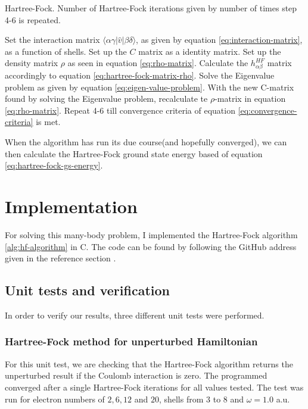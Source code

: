 \documentclass[11pt]{article}
\newcommand{\CC}{C\nolinebreak\hspace{-.05em}\raisebox{.4ex}{\tiny\bf +}\nolinebreak\hspace{-.10em}\raisebox{.4ex}{\tiny\bf +}}
\def\CC{{C\nolinebreak[4]\hspace{-.05em}\raisebox{.4ex}{\tiny\bf ++}}}
\begin{document}
\begin{algorithm}[H]
\caption{Hartree-Fock. Number of Hartree-Fock iterations given by number of times step 4-6 is repeated.}
\label{alg:hf-algorithm}
\begin{algorithmic}[1]
\State Set the interaction matrix $\langle \alpha \gamma |\hat{v}| \beta \delta \rangle$, as given by equation \eqref{eq:interaction-matrix}, as a function of shells.
\State Set up the $C$ matrix as a identity matrix.
\State Set up the density matrix $\rho$ as seen in equation \eqref{eq:rho-matrix}.
\State Calculate the $h^{HF}_{\alpha\beta}$ matrix accordingly to equation \eqref{eq:hartree-fock-matrix-rho}.
\State Solve the Eigenvalue problem as given by equation \eqref{eq:eigen-value-problem}.
\State With the new C-matrix found by solving the Eigenvalue problem, recalculate te $\rho$-matrix in equation \eqref{eq:rho-matrix}.
\State Repeat 4-6 till convergence criteria of equation \eqref{eq:convergence-criteria} is met.
\end{algorithmic}
\end{algorithm}

When the algorithm has run its due course(and hopefully converged), we can then calculate the Hartree-Fock ground state energy based of equation \eqref{eq:hartree-fock-gs-energy}.

\section{Implementation}
For solving this many-body problem, I implemented the Hartree-Fock algorithm \ref{alg:hf-algorithm} in \CC. The code can be found by following the GitHub address given in the reference section \cite{github}.

\subsection{Unit tests and verification}
In order to verify our results, three different unit tests were performed.

\subsubsection{Hartree-Fock method for unperturbed Hamiltonian}
For this unit test, we are checking that the Hartree-Fock algorithm returns the unperturbed result if the Coulomb interaction is zero. The programmed converged after a single Hartree-Fock iterations for all values tested. The test was run for electron numbers of $2,6,12$ and $20$, shells from $3$ to $8$ and $\omega=1.0$ a.u.
\end{document}
